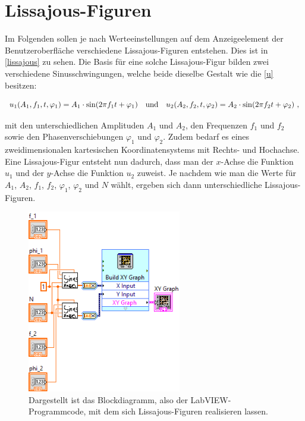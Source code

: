 \documentclass[
a4paper,
12pt,
pagesize,
ngerman
]{scrartcl}
\begin{document}
	\section{Lissajous-Figuren}
	
	Im Folgenden sollen je nach Werteeinstellungen auf dem Anzeigeelement der Benutzeroberfläche verschiedene Lissajous-Figuren entstehen. Dies ist in \cref{lissajous} zu sehen. Die Basis für eine solche Lissajous-Figur bilden zwei verschiedene Sinusschwingungen, welche beide dieselbe Gestalt wie die \cref{u} besitzen:
	
	\begin{equation} \label{u1u2}
	u_1(A_1,f_1,t,\varphi_1) = A_1 \cdot \sin(2\pi f_1 t + \varphi_1) \ \ \ \textnormal{und} \ \ \ u_2(A_2,f_2,t,\varphi_2) = A_2 \cdot \sin(2\pi f_2 t + \varphi_2) \ ,
	\end{equation}
	
	\noindent mit den unterschiedlichen Amplituden $A_1$ und $A_2$, den Frequenzen $f_1$ und $f_2$ sowie den Phasenverschiebungen $\varphi_1$ und $\varphi_2$. Zudem bedarf es eines zweidimensionalen kartesischen Koordinatensystems mit Rechts- und Hochachse. Eine Lissajous-Figur entsteht nun dadurch, dass man der $x$-Achse die Funktion $u_1$ und der $y$-Achse die Funktion $u_2$ zuweist. Je nachdem wie man die Werte für $A_1$, $A_2$, $f_1$, $f_2$, $\varphi_1$, $\varphi_2$ und $N$ wählt, ergeben sich dann unterschiedliche Lissajous-Figuren.
	
	\begin{figure}[H]
		\centering
		\includegraphics[width=0.6\textwidth]{EIRE2018Dateien/Tag1/lissajous-bilder/Lissajousd}
		\caption{Dargestellt ist das Blockdiagramm, also der LabVIEW-Programmcode, mit dem sich Lissajous-Figuren realisieren lassen.}
		\label{lissajousprogrammcode}
	\end{figure}
\end{document}
